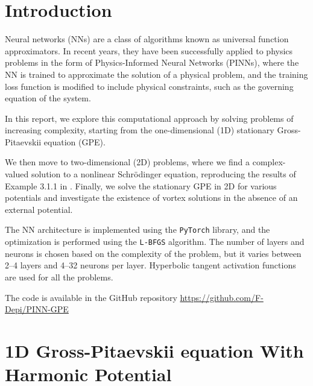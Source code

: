 \documentclass[a4paper, titlepage]{article}
\begin{document}


\newcommand{\gpe}{Gross-Pitaevskii equation }




\section*{Introduction}

Neural networks (NNs) are a class of algorithms known as universal function 
approximators. In recent years, they have been successfully applied to physics 
problems in the form of Physics-Informed Neural Networks (PINNs), where the 
NN is trained to approximate the solution of a physical problem, and the 
training loss function is modified to include physical constraints, such as the 
governing equation of the system.

In this report, we explore this computational approach by solving problems of 
increasing complexity, starting from the one-dimensional (1D) stationary
\gpe (GPE).

We then move to two-dimensional (2D) problems, where we find a complex-valued 
solution to a nonlinear Schr\"{o}dinger equation, reproducing the results of 
Example 3.1.1 in \cite{RAISSI2019686}. Finally, we solve the stationary GPE in 
2D for various potentials and investigate the existence of vortex solutions in 
the absence of an external potential.

The NN architecture is implemented using the \texttt{PyTorch} library, and the
optimization is performed using the \texttt{L-BFGS} algorithm.
The number of layers and neurons is chosen based on the complexity of the
problem, but it varies between 2--4 layers and 4--32 neurons per layer. 
Hyperbolic tangent activation functions are used for all the problems.

The code is available in the GitHub repository \url{https://github.com/F-Depi/PINN-GPE}




\section{1D \gpe With Harmonic Potential} \label{sec:1d_gpe}
\end{document}
